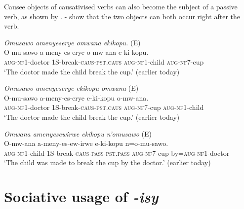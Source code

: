 \documentclass[output=paper,colorlinks,citecolor=brown,draftmode]{langscibook}
\begin{document}
Causee objects of causativised verbs can also become the subject of a passive verb, as shown by . - show that the two objects can both occur right after the verb.

\ea
\begin{xlist}   \label{ex:Saebo:causee-object}
    \ex \label{ex:Saebo:causee-objectA} \emph{Omusawo amenyeserye omwana ekikopu. } (E) \\
  \gll  O-mu-sawo a-meny-es-erye o-mw-ana e-ki-kopu.\\ 
\textsc{aug-nf1}-doctor 1S-break-\textsc{caus-pst.caus} \textsc{aug-nf1}-child \textsc{aug-nf7}-cup \\
    \glt  `The doctor made the child break the cup.' (earlier today) 

\ex \label{ex:Saebo:causee-objectB} \emph{Omusawo amenyeserye  ekikopu omwana}  (E) \\
  \gll O-mu-sawo a-meny-es-erye  e-ki-kopu o-mw-ana. \\ 
\textsc{aug-nf1}-doctor 1S-break-\textsc{caus-pst.caus} \textsc{aug-nf7}-cup \textsc{aug-nf1}-child \\
    \glt  `The doctor made the child break the cup.' (earlier today) 

\ex \label{ex:Saebo:causee-objectC} \emph{Omwana amenyesewirwe ekikopu n'omusawo }  (E)\\
  \gll  O-mw-ana a-meny-es-ew-irwe e-ki-kopu n=o-mu-sawo. \\ 
\textsc{aug-nf1}-child 1S-break-\textsc{caus-pass-pst.pass} \textsc{aug-nf7}-cup by=\textsc{aug-nf1}-doctor\\
    \glt  `The child was made to break the cup by the doctor.' (earlier today) 
  

    
      \end{xlist}     
      \z


\section{Sociative usage of \emph{-isy}} \label{sec:Saebo:sociative}
\end{document}
